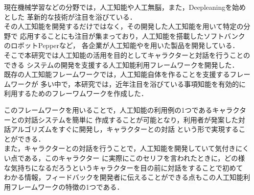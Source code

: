 %

現在機械学習などの分野では，人工知能や人工無脳，また，Deepleaningを始めとした
革新的な技術が注目を浴びている．
\\
その人工知能を開発するだけではなく，その開発した人工知能を用いて特定の分野で
応用することにも注目が集まっており，人工知能を搭載したソフトバンクのロボットPepperなど，
各企業が人工知能やを用いた製品を開発している．
\\
そこで本研究では人工知能の活用を目的としてキャラクターと対話を行うことのできる
システムの開発を支援する人工知能利用フレームワークを開発した．
\\
既存の人工知能フレームワークでは，人工知能自体を作ることを支援するフレームワークが
多い中で，本研究では，近年注目を浴びている事項知能を有効的に利用するためのフレーワムワークを作成した．

このフレームワークを用いることで，人工知能の利用例の1つであるキャラクターとの対話システムを簡単に
作成することが可能となり，利用者が発案した対話アルゴリズムをすぐに開発し，キャラクターとの対話
という形で実現することができる．\\

また，キャラクターとの対話を行うことで，人工知能を開発していて気付きにくい点である，このキャラクター
に実際にこのセリフを言われたときに，どの様な気持ちになるだろうというキャラクターを目の前に対話をすることで初めて
わかる情報，フィードバックを開発者に伝えることができる点もこの人工知能利用フレームワークの特徴の1つである．